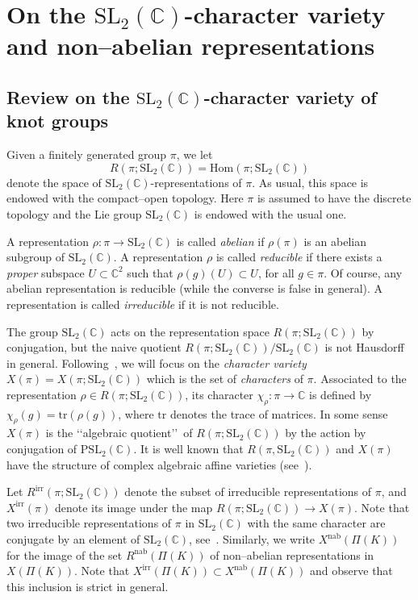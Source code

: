 \documentclass[a4paper]{amsart}
\theoremstyle{plain}
\theoremstyle{definition}
\theoremstyle{remark}
\newcommand{\C}{{\mathbb C}}
\newcommand{\SL}{{\mathrm{SL}_2(\C)}}
\newcommand{\PSL}{{\mathrm{PSL}_2(\C)}}
\begin{document}
\section{On the $\SL$-character variety and non--abelian representations}
\label{section:review_character_variety}
\subsection{Review on the $\SL$-character variety of knot groups}
\label{ModuliK}


Given a finitely genera\-ted group $\pi$, we let $$R(\pi; \SL) = \mathrm{Hom}(\pi; \SL)$$ denote the space of $\SL$-representations of $\pi$. As usual, this space is endowed with the {compact--open topology}. Here $\pi$ is assumed to have the discrete topology and the Lie group $\SL$ is endowed with the usual one. 

A representation $\rho \colon \pi \to \SL$ is called \emph{abelian} if $\rho(\pi)$ is an abelian subgroup of $\SL$.  A representation $\rho$ is called \emph{reducible} if there exists a \emph{proper} subspace $U \subset \C^2$ such that $\rho(g)(U) \subset U$, for all $g \in \pi$. Of course, any abelian representation is reducible (while the converse is false in general). A  
representation is called {\it irreducible} if it is not reducible.

  The group $\SL$ acts on the representation space $R(\pi; \SL)$ by conjugation, but the naive quotient $R(\pi; \SL)/\SL$ is not Hausdorff in general. Following~\cite{CS:1983}, we will focus on the \emph{character variety} $X(\pi) = X(\pi; \SL)$ which is the set of \emph{characters} of $\pi$. Associated to the representation $\rho \in R(\pi; \SL)$, its character $\chi_\rho \colon \pi \to \C$ is defined by $\chi_\rho(g) = \mathrm{tr}(\rho(g))$, where $\mathrm{tr}$ denotes the trace of matrices. 
    In some sense $X(\pi)$ is the \lq\lq algebraic quotient\rq\rq\, of $R(\pi; \SL)$ by the action by conjugation of $\PSL$. It is well known that $R(\pi, \SL)$ and $X(\pi)$ have the structure of {complex algebraic affine varieties} (see~\cite{CS:1983}).

  
  Let ${R}^\mathrm{irr}(\pi; \SL)$ denote the subset of irreducible representations of $\pi$, and $X^\mathrm{irr}(\pi)$ denote its image under the map ${R}(\pi; \SL) \to X(\pi)$. Note that two irreducible representations of $\pi$ in $\SL$ with the same character are conjugate by an element of $\SL$, see~\cite[Proposition 1.5.2]{CS:1983}. Similarly, we write $X^\mathrm{nab}(\Pi(K))$ for the image of the set $R^{\mathrm{nab}}(\Pi(K))$ of non--abelian representations in $X(\Pi(K))$. 
Note that $X^\mathrm{irr}(\Pi(K)) \subset X^\mathrm{nab}(\Pi(K))$ and observe that this inclusion is strict in general.
\end{document}
